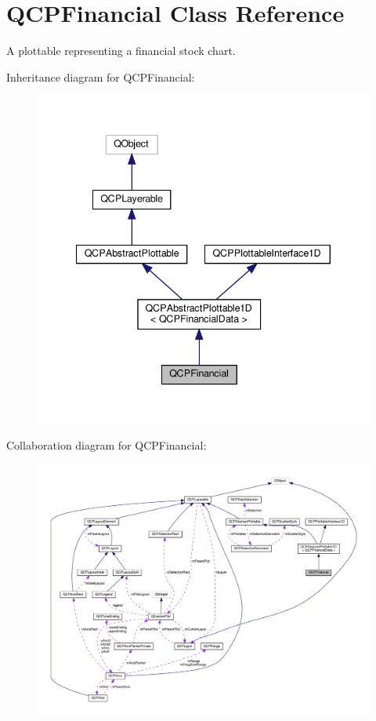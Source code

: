 \hypertarget{classQCPFinancial}{}\section{Q\+C\+P\+Financial Class Reference}
\label{classQCPFinancial}


A plottable representing a financial stock chart.  




Inheritance diagram for Q\+C\+P\+Financial\+:\nopagebreak
\begin{figure}[H]
\begin{center}
\leavevmode
\includegraphics[width=340pt]{classQCPFinancial__inherit__graph}
\end{center}
\end{figure}


Collaboration diagram for Q\+C\+P\+Financial\+:\nopagebreak
\begin{figure}[H]
\begin{center}
\leavevmode
\includegraphics[width=350pt]{classQCPFinancial__coll__graph}
\end{center}
\end{figure}
